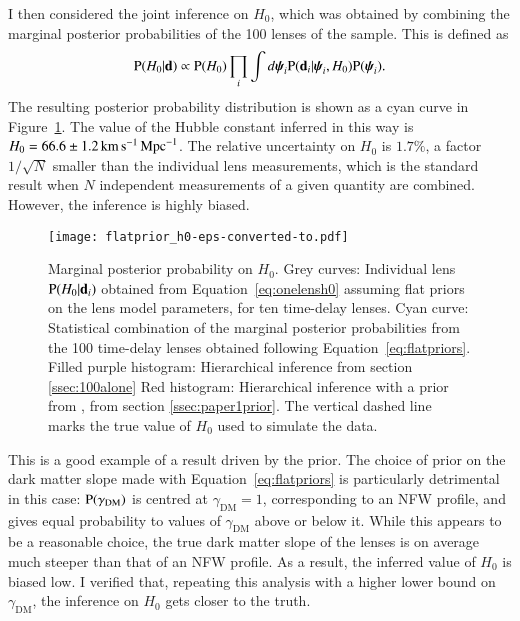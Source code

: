 \documentclass{aa}
\def\gammadm{\gamma_{\mathrm{DM}}}
\def\indpari{\boldsymbol{\psi}_i}
\def\data{\mathbf{d}}
\def\datai{\mathbf{d}_i}
\def\Fref#1{Figure~\ref{#1}\xspace}
\def\Eref#1{Equation~\ref{#1}\xspace}
\def\pr{{\rm P}}
\begin{document}
I then considered the joint inference on $H_0$, which was obtained by combining the marginal posterior probabilities of the 100 lenses of the sample. This is defined as
\begin{equation}\label{eq:simplecomb}
\pr(H_0|\data) \propto \pr(H_0) \prod_i \int d\indpari \pr(\datai|\indpari,H_0)\pr(\indpari).
\end{equation}
The resulting posterior probability distribution is shown as a cyan curve in \Fref{fig:marginal}.
The value of the Hubble constant inferred in this way is $H_0 = 66.6\pm1.2\,\rm{km}\,\rm{s}^{-1}\,\rm{Mpc}^{-1}$. The relative uncertainty on $H_0$ is $1.7\%$, a factor $1/\sqrt{N}$ smaller than the individual lens measurements, which is the standard result when $N$ independent measurements of a given quantity are combined.
However, the inference is highly biased.
\begin{figure}
\texttt{[image: flatprior\_h0-eps-converted-to.pdf]}
\caption{
Marginal posterior probability on $H_0$.
Grey curves: Individual lens $\pr(H_0|\datai)$ obtained from \Eref{eq:onelensh0} assuming flat priors on the lens model parameters, for ten time-delay lenses.
Cyan curve: Statistical combination of the marginal posterior probabilities from the 100 time-delay lenses obtained following \Eref{eq:flatpriors}.
Filled purple histogram: Hierarchical inference from section \ref{ssec:100alone}
Red histogram: Hierarchical inference with a prior from , from section \ref{ssec:paper1prior}.
The vertical dashed line marks the true value of $H_0$ used to simulate the data.
\label{fig:marginal}
}
\end{figure}

This is a good example of a result driven by the prior.
The choice of prior on the dark matter slope made with \Eref{eq:flatpriors} is particularly detrimental in this case: $\pr(\gammadm)$ is centred at $\gammadm=1$, corresponding to an NFW profile, and gives equal probability to values of $\gammadm$ above or below it. While this appears to be a reasonable choice, the true dark matter slope of the lenses is on average much steeper than that of an NFW profile. As a result, the inferred value of $H_0$ is biased low. I verified that, repeating this analysis with a higher lower bound on $\gammadm$, the inference on $H_0$ gets closer to the truth.
\end{document}
